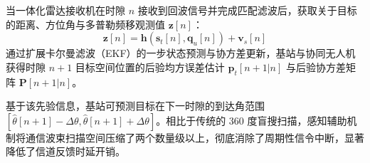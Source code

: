 当一体化雷达接收机在时隙 $n$ 接收到回波信号并完成匹配滤波后，获取关于目标的距离、方位角与多普勒频移观测值 $\mathbf{z}[n]$：
\begin{equation}
  \mathbf{z}[n] = \mathbf{h}(\mathbf{s}_t[n], \mathbf{q}_u[n]) + \mathbf{v}_s[n]
\end{equation}
通过扩展卡尔曼滤波（EKF）的一步状态预测与协方差更新，基站与协同无人机获得时隙 $n+1$ 目标空间位置的后验均方误差估计 $\hat{\mathbf{p}}_t[n+1|n]$ 与后验协方差矩阵 $\mathbf{P}[n+1|n]$。

基于该先验信息，基站可预测目标在下一时隙的到达角范围 $[\hat{\theta}[n+1] - \Delta \theta, \hat{\theta}[n+1] + \Delta \theta]$。相比于传统的 360 度盲搜扫描，感知辅助机制将通信波束扫描空间压缩了两个数量级以上，彻底消除了周期性信令中断，显著降低了信道反馈时延开销。
